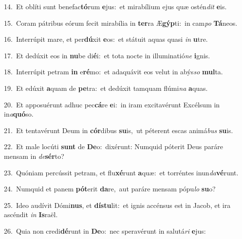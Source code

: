 {\numbfont\textcolor{\numbcolor}{14.}}~Et oblíti sunt benefac\-\textbf{tó}\-rum \textbf{e}\-jus:~\star et mirabílium ejus quæ ostén\textit{dit} \textbf{e}\-is.\par
{\numbfont\textcolor{\numbcolor}{15.}}~Coram pátribus eórum fecit mirabília in \textbf{ter}\-ra Æ\-\textbf{gýp}\-ti:~\star in cam\textit{po} \textbf{Tá}\-neos.\par
{\numbfont\textcolor{\numbcolor}{16.}}~Interrúpit mare, et per\-\textbf{dú}\-xit \textbf{e}\-os:~\star et státuit aquas quasi \textit{in} \textbf{u}\-tre.\par
{\numbfont\textcolor{\numbcolor}{17.}}~Et dedúxit eos in \textbf{nu}\-be di\-\textbf{é}\-i:~\star et tota nocte in illuminatió\textit{ne} \textbf{i}\-gnis.\par
{\numbfont\textcolor{\numbcolor}{18.}}~Interrúpit petram \textbf{in} e\-\textbf{ré}\-mo:~\star et adaquávit eos velut in abýs\textit{so} \textbf{mul}\-ta.\par
{\numbfont\textcolor{\numbcolor}{19.}}~Et edúxit \textbf{a}\-quam de \textbf{pe}\-tra:~\star et dedúxit tamquam flúmi\textit{na} \textbf{a}\-quas.\par
{\numbfont\textcolor{\numbcolor}{20.}}~Et apposuérunt adhuc pec\-\textbf{cá}\-re \textbf{e}\-i:~\star in iram excitavérunt Excélsum in in\-\textit{a}\-\textbf{quó}so.\par
{\numbfont\textcolor{\numbcolor}{21.}}~Et tentavérunt Deum in \textbf{cór}\-dibus \textbf{su}\-is,~\star ut péterent escas animá\textit{bus} \textbf{su}\-is.\par
{\numbfont\textcolor{\numbcolor}{22.}}~Et male locúti \textbf{sunt} de \textbf{De}\-o:~\star dixérunt: Numquid póterit Deus paráre mensam in \textit{de}\-\textbf{sér}to?\par
{\numbfont\textcolor{\numbcolor}{23.}}~Quóniam percússit petram, et flu\-\textbf{xé}\-runt \textbf{a}\-quæ:~\star et torréntes inun\-\textit{da}\-\textbf{vé}runt.\par
{\numbfont\textcolor{\numbcolor}{24.}}~Numquid et panem \textbf{pót}\-erit \textbf{da}\-re,~\star aut paráre mensam pópu\textit{lo} \textbf{su}\-o?\par
{\numbfont\textcolor{\numbcolor}{25.}}~Ideo audívit Dómi\-\textbf{nus}\-, et \textbf{dís}\-\textbf{tu}lit:~\star et ignis accénsus est in Jacob, et ira ascéndit \textit{in} \textbf{Is}\-raël.\par
{\numbfont\textcolor{\numbcolor}{26.}}~Quia non credi\-\textbf{dé}\-runt in \textbf{De}\-o:~\star nec speravérunt in salutá\textit{ri} \textbf{e}\-jus:\par
